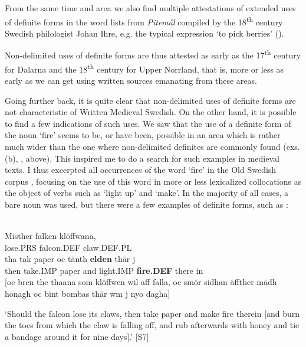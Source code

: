 \z

From the same time and area we also find multiple attestations of extended uses of definite forms in the word lists from \textit{Pitemål} compiled by the 18\textsuperscript{th} century Swedish philologist Johan Ihre, e.g. the typical expression ‘to pick berries’ (\citet{Reinhammar2002}).

Non-delimited uses of definite forms are thus attested as early as the 17\textsuperscript{th} century for Dalarna and the 18\textsuperscript{th} century for Upper Norrland, that is, more or less as early as we can get using written sources emanating from these areas. 

Going further back, it is quite clear that non-delimited uses of definite forms are not characteristic of Written Medieval Swedish. On the other hand, it is possible to find a few indications of such uses. We saw that the use of a definite form of the noun  ‘fire’ seems to be, or have been, possible in an area which is rather much wider than the one where non-delimited definites are commonly found (exs. (b), ,  above). This inspired me to do a search for such examples in medieval texts. I thus excerpted all occurrences of the word  ‘fire’ in the Old Swedish corpus , focusing on the use of this word in more or less lexicalized collocations as the object of verbs such as  ‘light up’ and  ‘make’. In the majority of all cases, a bare noun was used, but there were a few examples of definite forms, such as :

\ea \label{} 
\\
\gll Misther  falken  klöffwana,\\
lose.PRS  falcon.DEF  claw.DEF.PL\\
\gll tha  tak  paper  oc  tänth  \textbf{elden}  thär  j\\
then  take.IMP  paper  and  light.IMP  \textbf{fire.DEF} there   in\\
[oc bren the thaana som klöffwen wil aff falla, oc smör sidhan äffther mädh honagh oc bint bombas thär wm j nyo dagha]


\glt ‘Should the falcon lose its claws, then take paper and make fire therein [and burn the toes from which the claw is falling off, and rub afterwards with honey and tie a bandage around it for nine days].’ [S7]

